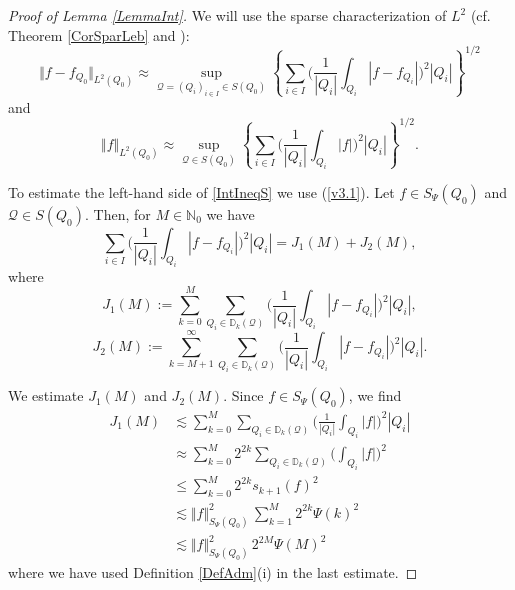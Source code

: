 \documentclass[11pt, a4paper,leqno]{amsart}
\theoremstyle{plain}
\numberwithin{equation}{section}
\theoremstyle{definition}
\theoremstyle{remark}
\begin{document}
\begin{proof}
[Proof of Lemma \ref{LemmaInt}]We will use the sparse characterization of
$L^{2}$ (cf. Theorem \ref{CorSparLeb} and \cite{DMComptes}):
\begin{equation}
\Vert f-f_{Q_{0}}\Vert_{L^{2}(Q_{0})}\approx\sup_{\mathcal{Q}=(Q_{i})_{i\in
I}\in S(Q_{0})}\left\{  \sum_{i\in I}\bigg(\frac{1}{|Q_{i}|}\int_{Q_{i}%
}|f-f_{Q_{i}}|\bigg)^{2}|Q_{i}|\right\}  ^{1/2}\label{v3.1}%
\end{equation}
and
\begin{equation}
\Vert f\Vert_{L^{2}(Q_{0})}\approx\sup_{\mathcal{Q} \in
S(Q_{0})}\left\{  \sum_{i\in I}\bigg(\frac{1}{|Q_{i}|}\int_{Q_{i}%
}|f|\bigg)^{2}|Q_{i}|\right\}  ^{1/2}.\label{v3.1new2}%
\end{equation}


To estimate the left-hand side of \eqref{IntIneqS} we use (\ref{v3.1}). Let
$f\in S_{\Psi}(Q_0)$ and  $\mathcal{Q} \in S(Q_{0}).$ Then,
for $M\in\mathbb{N}_{0}$ we have
\begin{equation}
\sum_{i\in I}\bigg(\frac{1}{|Q_{i}|}\int_{Q_{i}}|f-f_{Q_{i}}|\bigg)^{2}|Q_{i}|
  =J_{1}(M)+J_{2}(M),\label{v3.2new}%
\end{equation}
where%
\[
J_{1}(M):=\sum_{k=0}^{M}\sum_{Q_{i}\in \mathbb{D}_{k}(\mathcal{Q}%
)}\bigg(\frac{1}{|Q_{i}|}\int_{Q_{i}}|f-f_{Q_{i}}|\bigg)^{2}|Q_{i}|,
\]
\[
J_{2}(M):=\sum_{k=M+1}^{\infty}\sum_{Q_{i}\in \mathbb{D}%
_{k}(\mathcal{Q})}\bigg(\frac{1}{|Q_{i}|}\int_{Q_{i}}|f-f_{Q_{i}}|\bigg)^{2}|Q_{i}|.
\]


We estimate $J_{1}(M)$ and $J_{2}(M)$. Since $f\in S_{\Psi}(Q_0)$, we find
\begin{align}
J_{1} (M)&  \lesssim\sum_{k=0}^{M}\sum_{Q_{i}\in \mathbb{D}%
_{k}(\mathcal{Q})}\bigg(\frac{1}{|Q_{i}|}\int_{Q_{i}}|f|\bigg)^{2}|Q_{i}| \nonumber\\
&  \approx\sum_{k=0}^{M}2^{2k}\sum_{Q_{i}\in \mathbb{D}%
_{k}(\mathcal{Q})}\bigg(\int_{Q_{i}}|f|\bigg)^{2}\nonumber\\
&  \leq\sum_{k=0}^{M}2^{2k}s_{k+1}(f)^{2}\nonumber\\
&  \lesssim \Vert f\Vert_{S_{\Psi}(Q_{0})}^{2}\,\sum_{k=1}^{M}2^{2k}%
\Psi(k)^{2}\nonumber\\
&  \lesssim\Vert f\Vert_{S_{\Psi}(Q_{0})}^{2}\,2^{2M}\Psi
(M)^{2} \label{v3.4}%
\end{align}
where we have used Definition \ref{DefAdm}(i) in the last estimate.  



\end{proof}
\end{document}

